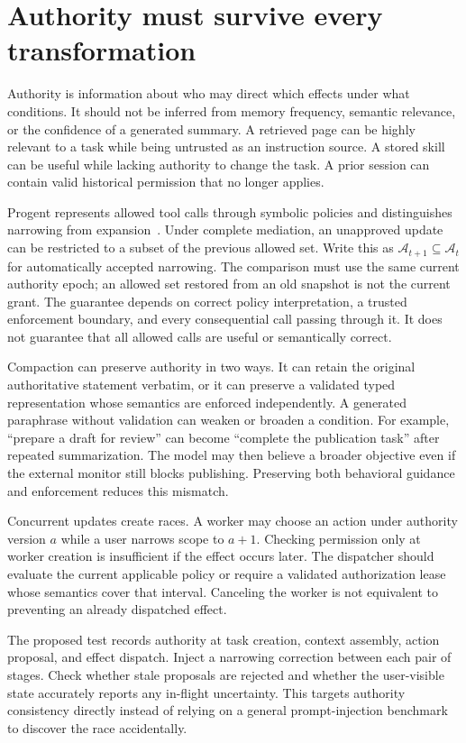 \section{Authority must survive every transformation}\label{sec:C17:authority}
Authority is information about who may direct which effects under what conditions. It should not be inferred from memory frequency, semantic relevance, or the confidence of a generated summary. A retrieved page can be highly relevant to a task while being untrusted as an instruction source. A stored skill can be useful while lacking authority to change the task. A prior session can contain valid historical permission that no longer applies.

Progent represents allowed tool calls through symbolic policies and distinguishes narrowing from expansion~\cite{corpus250411703}. Under complete mediation, an unapproved update can be restricted to a subset of the previous allowed set. Write this as $\mathcal A_{t+1}\subseteq\mathcal A_t$ for automatically accepted narrowing. The comparison must use the same current authority epoch; an allowed set restored from an old snapshot is not the current grant. The guarantee depends on correct policy interpretation, a trusted enforcement boundary, and every consequential call passing through it. It does not guarantee that all allowed calls are useful or semantically correct.

Compaction can preserve authority in two ways. It can retain the original authoritative statement verbatim, or it can preserve a validated typed representation whose semantics are enforced independently. A generated paraphrase without validation can weaken or broaden a condition. For example, ``prepare a draft for review'' can become ``complete the publication task'' after repeated summarization. The model may then believe a broader objective even if the external monitor still blocks publishing. Preserving both behavioral guidance and enforcement reduces this mismatch.

Concurrent updates create races. A worker may choose an action under authority version $a$ while a user narrows scope to $a+1$. Checking permission only at worker creation is insufficient if the effect occurs later. The dispatcher should evaluate the current applicable policy or require a validated authorization lease whose semantics cover that interval. Canceling the worker is not equivalent to preventing an already dispatched effect.

The proposed test records authority at task creation, context assembly, action proposal, and effect dispatch. Inject a narrowing correction between each pair of stages. Check whether stale proposals are rejected and whether the user-visible state accurately reports any in-flight uncertainty. This targets authority consistency directly instead of relying on a general prompt-injection benchmark to discover the race accidentally.

